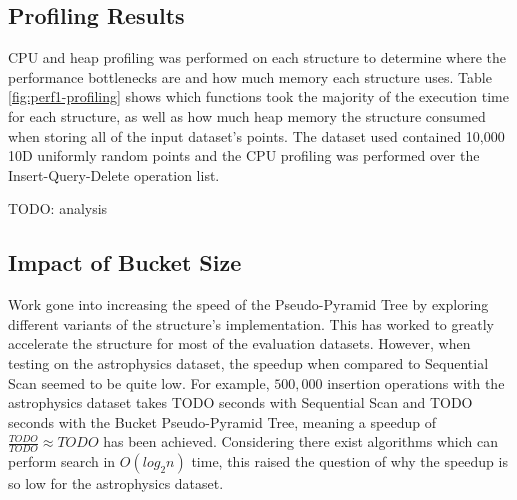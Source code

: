 \subsection{Profiling Results}

CPU and heap profiling was performed on each structure to determine where the performance bottlenecks are and how much memory each structure uses. Table \ref{fig:perf1-profiling} shows which functions took the majority of the execution time for each structure, as well as how much heap memory the structure consumed when storing all of the input dataset's points. The dataset used contained 10,000 10D uniformly random points and the CPU profiling was performed over the Insert-Query-Delete operation list.

\begin{table}
	\centering
	\caption{CPU and Heap Profiling Statistics for Insert-Query Delete Operation List with 500,000 Points from 16D Synthetic Dataset}
	\label{tab:perf1-profiling}
\end{table}

TODO: analysis

\subsection{Impact of Bucket Size}

Work gone into increasing the speed of the Pseudo-Pyramid Tree by exploring different variants of the structure's implementation. This has worked to greatly accelerate the structure for most of the evaluation datasets. However, when testing on the astrophysics dataset, the speedup when compared to Sequential Scan seemed to be quite low. For example, $500,000$ insertion operations with the astrophysics dataset takes TODO seconds with Sequential Scan and TODO seconds with the Bucket Pseudo-Pyramid Tree, meaning a speedup of $\frac{TODO}{TODO} \approx TODO$ has been achieved. Considering there exist algorithms which can perform search in $O(log_2 n)$ time, this raised the question of why the speedup is so low for the astrophysics dataset.

